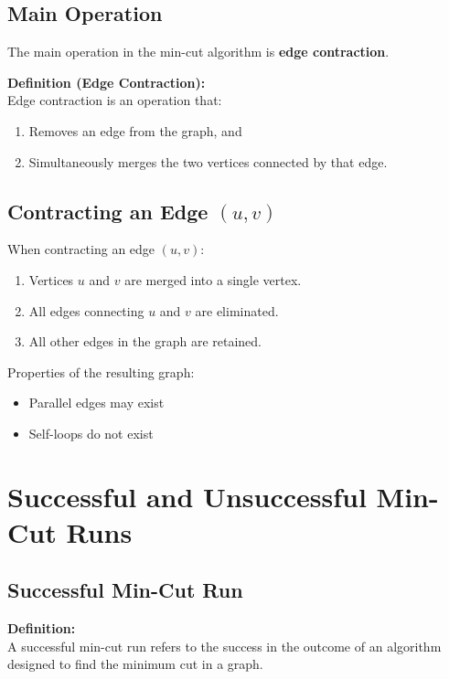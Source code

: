 \documentclass[12pt]{article}
\begin{document}
\subsection{Main Operation}

The main operation in the min-cut algorithm is \textbf{edge contraction}.

\textbf{Definition (Edge Contraction):} \\
Edge contraction is an operation that:
\begin{enumerate}
    \item Removes an edge from the graph, and
    \item Simultaneously merges the two vertices connected by that edge.
\end{enumerate}

\subsection{Contracting an Edge $(u, v)$}

When contracting an edge $(u, v)$:

\begin{enumerate}
    \item Vertices $u$ and $v$ are merged into a single vertex.
    \item All edges connecting $u$ and $v$ are eliminated.
    \item All other edges in the graph are retained.
\end{enumerate}

Properties of the resulting graph:
\begin{itemize}
    \item Parallel edges may exist
    \item Self-loops do not exist
\end{itemize}

\section{Successful and Unsuccessful Min-Cut Runs}

\subsection{Successful Min-Cut Run}

\textbf{Definition:} \\
A successful min-cut run refers to the success in the outcome of an algorithm designed to find the minimum cut in a graph.
\end{document}
